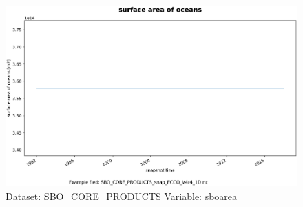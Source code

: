 \begin{figure}[H]
\centering
\includegraphics[width=\textwidth]{../images/plots/oneD_plots/SBO_Core_Products/sboarea.png}
\caption{Dataset: SBO\_CORE\_PRODUCTS Variable: sboarea}
\label{tab:table-SBO_CORE_PRODUCTS_sboarea-Plot}
\end{figure}
\pagebreak
